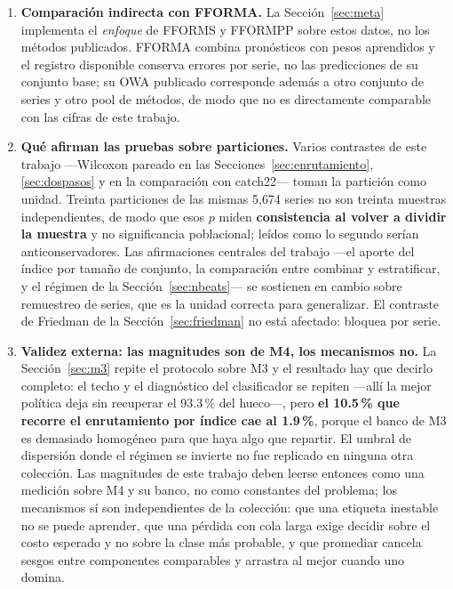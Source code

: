 \begin{enumerate}
\item \textbf{Comparación indirecta con FFORMA.} La Sección~\ref{sec:meta}
      implementa el \emph{enfoque} de FFORMS y FFORMPP sobre estos datos, no los
      métodos publicados. FFORMA combina pronósticos con pesos aprendidos y el
      registro disponible conserva errores por serie, no las predicciones de su
      conjunto base; su OWA publicado corresponde además a otro conjunto de series
      y otro pool de métodos, de modo que no es directamente comparable con las
      cifras de este trabajo.

\item \textbf{Qué afirman las pruebas sobre particiones.} Varios contrastes de este
      trabajo ---Wilcoxon pareado en las Secciones~\ref{sec:enrutamiento},
      \ref{sec:dospasos} y en la comparación con catch22--- toman la partición como
      unidad. Treinta particiones de las mismas 5{,}674 series no son treinta muestras
      independientes, de modo que esos $p$ miden \textbf{consistencia al volver a dividir
      la muestra} y no significancia poblacional; leídos como lo segundo serían
      anticonservadores. Las afirmaciones centrales del trabajo ---el aporte del índice
      por tamaño de conjunto, la comparación entre combinar y estratificar, y el régimen
      de la Sección~\ref{sec:nbeats}--- se sostienen en cambio sobre remuestreo de series,
      que es la unidad correcta para generalizar. El contraste de Friedman de la
      Sección~\ref{sec:friedman} no está afectado: bloquea por serie.

\item \textbf{Validez externa: las magnitudes son de M4, los mecanismos no.} La
      Sección~\ref{sec:m3} repite el protocolo sobre M3 y el resultado hay que decirlo
      completo: el techo y el diagnóstico del clasificador se repiten ---allí la mejor
      política deja sin recuperar el 93.3\,\% del hueco---, pero \textbf{el 10.5\,\% que
      recorre el enrutamiento por índice cae al 1.9\,\%}, porque el banco de M3 es
      demasiado homogéneo para que haya algo que repartir. El umbral de dispersión donde
      el régimen se invierte no fue replicado en ninguna otra colección. Las magnitudes de
      este trabajo deben leerse entonces como una medición sobre M4 y su banco, no como
      constantes del problema; los mecanismos sí son independientes de la colección: que
      una etiqueta inestable no se puede aprender, que una pérdida con cola larga exige
      decidir sobre el costo esperado y no sobre la clase más probable, y que promediar
      cancela sesgos entre componentes comparables y arrastra al mejor cuando uno domina.
\end{enumerate}



